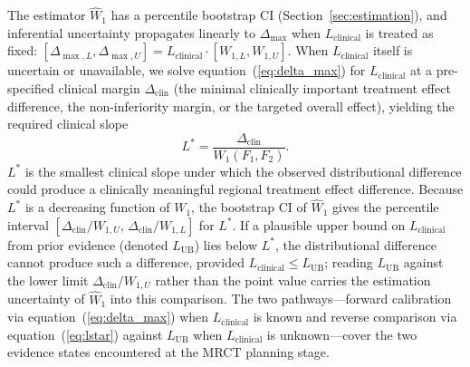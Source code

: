 The estimator $\widehat{W}_1$ has a percentile bootstrap CI (Section~\ref{sec:estimation}), and inferential uncertainty propagates linearly to $\Delta_{\max}$ when $L_{\text{clinical}}$ is treated as fixed: $[\Delta_{\max,L}, \Delta_{\max,U}] = L_{\text{clinical}} \cdot [W_{1,L}, W_{1,U}]$. When $L_{\text{clinical}}$ itself is uncertain or unavailable, we solve equation~(\ref{eq:delta_max}) for $L_{\text{clinical}}$ at a pre-specified clinical margin $\Delta_{\text{clin}}$ (the minimal clinically important treatment effect difference, the non-inferiority margin, or the targeted overall effect), yielding the required clinical slope
\begin{equation}
L^* = \frac{\Delta_{\text{clin}}}{W_1(F_1, F_2)}.
\label{eq:lstar}
\end{equation}
$L^*$ is the smallest clinical slope under which the observed distributional difference could produce a clinically meaningful regional treatment effect difference. Because $L^*$ is a decreasing function of $W_1$, the bootstrap CI of $\widehat{W}_1$ gives the percentile interval $[\Delta_{\text{clin}}/W_{1,U},\, \Delta_{\text{clin}}/W_{1,L}]$ for $L^*$. If a plausible upper bound on $L_{\text{clinical}}$ from prior evidence (denoted $L_{\text{UB}}$) lies below $L^*$, the distributional difference cannot produce such a difference, provided $L_{\text{clinical}} \leq L_{\text{UB}}$; reading $L_{\text{UB}}$ against the lower limit $\Delta_{\text{clin}}/W_{1,U}$ rather than the point value carries the estimation uncertainty of $\widehat{W}_1$ into this comparison. The two pathways---forward calibration via equation~(\ref{eq:delta_max}) when $L_{\text{clinical}}$ is known and reverse comparison via equation~(\ref{eq:lstar}) against $L_{\text{UB}}$ when $L_{\text{clinical}}$ is unknown---cover the two evidence states encountered at the MRCT planning stage.

